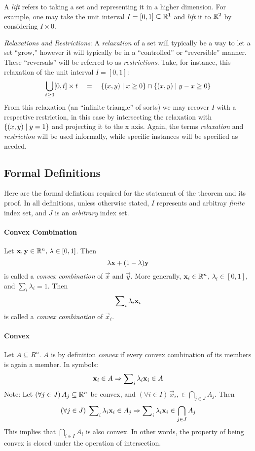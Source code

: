 A \textit{lift} refers to taking a set and representing it in a higher dimension.  For example, one may take the unit interval $I = [0,1] \subseteq \mathbb{R}^1$ and \textit{lift} it to $\mathbb{R}^2$ by considering $I \times {0}$.  

\textit{Relaxations and Restrictions}: A \textit{relaxation} of a set will typically be a way to let a set ``grow,'' however it will typically be in a ``controlled'' or ``reversible'' manner.  These ``reversals'' will be referred to as \textit{restrictions}.  Take, for instance, this relaxation of the unit interval $I = [0,1]$: 
  \[\bigcup_{t \geq 0} [0,t]\times t \quad=\quad 
    \{(x,y) \;|\; x \geq 0\} \cap \{(x,y) \;|\; y - x \geq 0\}\]  
From this relaxation (an ``infinite triangle'' of sorts) we may recover $I$ with a respective restriction, in this case by intersecting the relaxation with ${\{(x,y) \;|\; y = 1\}}$ and projecting it to the x axis.  Again, the terms \textit{relaxation} and \textit{restriction} will be used informally, while specific instances will be specified as needed.


\subsection{Formal Definitions}
Here are the formal defintions required for the statement of the theorem and its proof.  In all definitions, unless otherwise stated, $I$ represents and arbitray \textit{finite} index set, and $J$ is an \textit{arbitrary} index set.

\paragraph{Convex Combination} 
Let $\mathbf{x},\mathbf{y} \in \mathbb{R}^n,\, \lambda \in [0,1]$.  Then
  \[\lambda \mathbf{x} + (1-\lambda) \mathbf{y}\]
is called a \textit{convex combination} of $\vec{x}$ and $\vec{y}$.
More generally, $\mathbf{x}_i \in \mathbb{R}^n$, $\lambda_i \in [0,1]$, and $\sum_i \lambda_i = 1$.  Then 
  \[\sum\nolimits_{i} \lambda_{i} \mathbf{x}_{i}\]
is called a \textit{convex combination} of $\vec{x}_i$.

\paragraph{Convex} 
Let $A \subseteq R^n$.  $A$ is by definition \textit{convex} if every convex combination of its members is again a member.  In symbols:
  \[\mathbf{x}_i \in A \Rightarrow
    \sum\nolimits_{i} \lambda_{i} \mathbf{x}_{i} \in A\]
Note: Let $(\forall j \in J) \, A_j \subseteq \mathbb{R}^n$ be convex, and $(\forall i\in I)\,\vec{x}_i, \in \bigcap_{j\in J}A_j$.  Then 
  \[(\forall j\in J)\; \sum\nolimits_{i} \lambda_{i} \mathbf{x}_{i} \in A_j \Rightarrow \sum\nolimits_{i} \lambda_{i} \mathbf{x}_{i} \in \bigcap_{j \in J} A_j\]  
 This implies that $\bigcap_{i \in I} A_i$ is also convex.  In other words, the property of being convex is closed under the operation of intersection.

